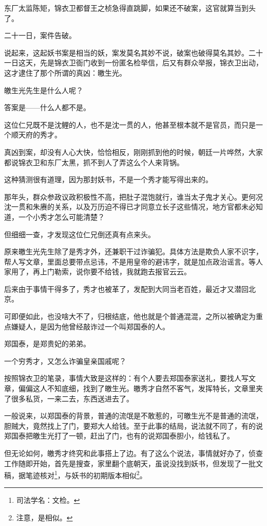 \begin{multicols}{\theparacolNo}
		东厂太监陈矩，锦衣卫都督王之桢急得直跳脚，如果还不破案，这官就算当到头了。

		二十一日，案件告破。

		说起来，这起妖书案是相当的妖，案发莫名其妙不说，破案也破得莫名其妙。二十一日这天，先是锦衣卫衙门收到一份匿名检举信，后又有群众举报，锦衣卫出动，这才逮住了那个所谓的真凶：皦生光。

		皦生光先生是什么人呢？

		答案是——什么人都不是。

		这位仁兄既不是沈鲤的人，也不是沈一贯的人，他甚至根本就不是官员，而只是一个顺天府的秀才。

		真凶到案，却没有人心大快，恰恰相反，刚刚抓到他的时候，朝廷一片哗然，大家都说锦衣卫和东厂太黑，抓不到人了弄这么个人来背锅。

		这种猜测很有道理，因为那封妖书，不是一个秀才能写得出来的。

		那年头，群众参政议政积极性不高，把肚子混饱就行，谁当太子鬼才关心。更何况沈一贯和朱赓的关系，以及万历迫不得已才同意立长子这些情况，地方官都未必知道，一个小秀才怎么可能清楚？

		但细细一查，才发现这位仁兄倒还真有点来头。

		原来皦生光先生除了是秀才外，还兼职干过诈骗犯。具体方法是欺负人家不识字，帮人写文章，里面总要带点忌讳，不是用皇帝的避讳字，就是加点政治谣言。等人家用了，再上门勒索，说你要不给钱，我就跑去报官云云。

		后来由于事情干得多了，秀才也被革了，发配到大同当老百姓，最近才又潜回北京。

		可即便如此，也没啥大不了，归根结底，他也就是个普通混混，之所以被确定为重点嫌疑人，是因为他曾经敲诈过一个叫郑国泰的人。

		郑国泰，是郑贵妃的弟弟。

		一个穷秀才，又怎么诈骗皇亲国戚呢？

		按照锦衣卫的笔录，事情大致是这样的：有个人要去郑国泰家送礼，要找人写文章，偏偏这人不知底细，找到了皦生光。皦秀才自然不客气，发挥特长，文章里夹了很多私货，一来二去，东西送进去了。

		一般说来，以郑国泰的背景，普通的流氓是不敢惹的，可皦生光不是普通的流氓，胆贼大，竟然找上了门，要郑大人给钱。至于此事的结局，说法就不同了，有的说郑国泰把皦生光打了一顿，赶出了门，也有的说郑国泰胆小，给钱私了。

		但无论如何，皦秀才终究和此事搭上了边。有了这么个说法，事情就好办了，侦查工作随即开始，首先是搜查，家里翻个底朝天，虽说没找到妖书，但发现了一批文稿，据笔迹核对\footnote{司法学名：文检。}，与妖书的初期版本相似\footnote{注意，是相似。}。


\end{multicols}
